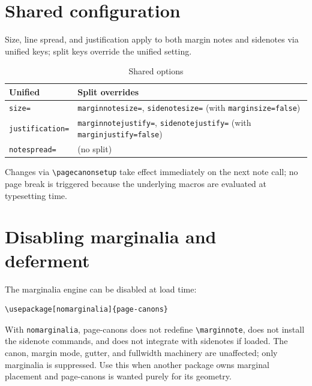 \documentclass[11pt, twoside, openany]{book}
\newcommand{\pkg}[1]{\textsf{#1}}
\newcommand{\cmd}[1]{\texttt{\textbackslash #1}}
\begin{document}
\section{Shared configuration}\label{sec:shared}

Size, line spread, and justification apply to both margin notes and sidenotes via unified keys; split keys override the unified setting.

\begin{table}[h]
	\centering
	\caption{Shared options}
	\label{tab:sharedopts}
	\begin{tabular}{ll}
		\textbf{Unified}        & \textbf{Split overrides}                                                                   \\
		\hline
		\texttt{size=}          & \texttt{marginnotesize=}, \texttt{sidenotesize=} (with \texttt{marginsize=false})          \\
		\texttt{justification=} & \texttt{marginnotejustify=}, \texttt{sidenotejustify=} (with \texttt{marginjustify=false}) \\
		\texttt{notespread=}    & (no split)                                                                                 \\
	\end{tabular}
\end{table}

Changes via \cmd{pagecanonsetup} take effect immediately on the next note call; no page break is triggered because the underlying macros are evaluated at typesetting time.

\section{Disabling marginalia and deferment}\label{sec:nomarginalia}

The marginalia engine can be disabled at load time:

\begin{verbatim}
\usepackage[nomarginalia]{page-canons}
\end{verbatim}

With \texttt{nomarginalia}, \pkg{page-canons} does not redefine \cmd{marginnote}, does not install the sidenote commands, and does not integrate with \pkg{sidenotes} if loaded. The canon, margin mode, gutter, and fullwidth machinery are unaffected; only marginalia is suppressed. Use this when another package owns marginal placement and \pkg{page-canons} is wanted purely for its geometry.
\end{document}
